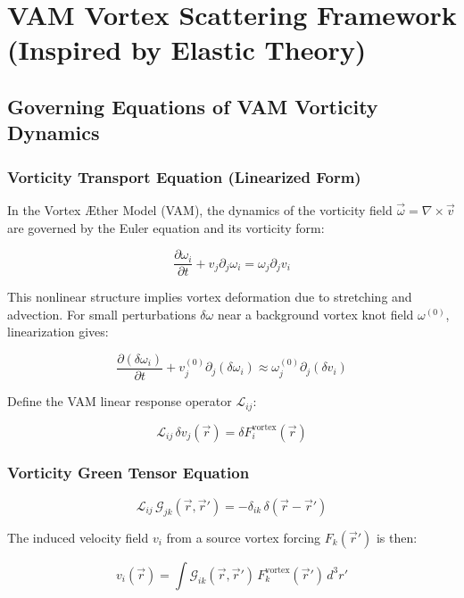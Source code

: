 

\section{VAM Vortex Scattering Framework (Inspired by Elastic Theory)}

\subsection{Governing Equations of VAM Vorticity Dynamics}

\subsubsection*{Vorticity Transport Equation (Linearized Form)}

In the Vortex Æther Model (VAM), the dynamics of the vorticity field \(\vec{\omega} = \nabla \times \vec{v}\) are governed by the Euler equation and its vorticity form:

\[
\frac{\partial \omega_i}{\partial t} + v_j \partial_j \omega_i = \omega_j \partial_j v_i
\]

This nonlinear structure implies vortex deformation due to stretching and advection. For small perturbations \(\delta\omega\) near a background vortex knot field \(\omega^{(0)}\), linearization gives:

\[
\frac{\partial (\delta \omega_i)}{\partial t} + v_j^{(0)} \partial_j (\delta \omega_i) \approx \omega_j^{(0)} \partial_j (\delta v_i)
\]

Define the VAM linear response operator \(\mathcal{L}_{ij}\):

\[
\mathcal{L}_{ij} \, \delta v_j(\vec{r}) = \delta F_i^{\text{vortex}}(\vec{r})
\]

\subsubsection*{Vorticity Green Tensor Equation}

\[
\mathcal{L}_{ij} \, \mathcal{G}_{jk}(\vec{r}, \vec{r}') = -\delta_{ik} \, \delta(\vec{r} - \vec{r}')
\]

The induced velocity field \(v_i\) from a source vortex forcing \(F_k(\vec{r}')\) is then:

\[
v_i(\vec{r}) = \int \mathcal{G}_{ik}(\vec{r}, \vec{r}') \, F_k^{\text{vortex}}(\vec{r}') \, d^3 r'
\]

